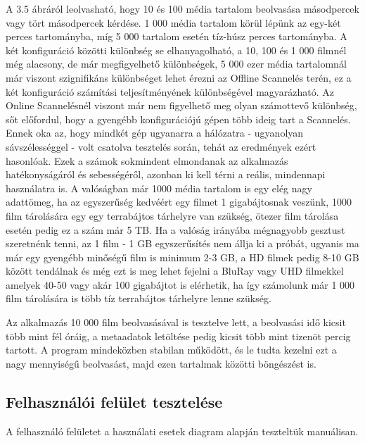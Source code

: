 A 3.5 ábráról leolvasható, hogy 10 és 100 média tartalom beolvasása másodpercek vagy tört másodpercek kérdése. 1 000 média tartalom körül lépünk az egy-két perces tartományba, míg 5 000 tartalom esetén tíz-húsz perces tartományba. A két konfiguráció közötti különbség se elhanyagolható, a 10, 100 és 1 000 filmnél még alacsony, de már megfigyelhető különbségek, 5 000 ezer média tartalomnál már viszont szignifikáns különbséget lehet érezni az Offline Scannelés terén, ez a két konfiguráció számítási teljesítményének különbségével magyarázható. Az Online Scannelésnél viszont már nem figyelhető meg olyan számottevő különbség, sőt előfordul, hogy a gyengébb konfigurációjú gépen több ideig tart a Scannelés. Ennek oka az, hogy mindkét gép ugyanarra a hálózatra - ugyanolyan sávszélességgel - volt csatolva tesztelés során, tehát az eredmények ezért hasonlóak.
Ezek a számok sokmindent elmondanak az alkalmazás hatékonyságáról és sebességéről, azonban ki kell térni a reális, mindennapi használatra is. A valóságban már 1000 média tartalom is egy elég nagy adattömeg, ha az egyszerűség kedvéért egy filmet 1 gigabájtosnak veszünk, 1000 film tárolására egy egy terrabájtos tárhelyre van szükség, ötezer film tárolása esetén pedig ez a szám már 5 TB. Ha a valóság irányába mégnagyobb gesztust szeretnénk tenni, az 1 film - 1 GB egyszerűsítés nem állja ki a próbát, ugyanis ma már egy gyengébb minőségű film is minimum 2-3 GB, a HD filmek pedig 8-10 GB között tendálnak és még ezt is meg lehet fejelni a BluRay vagy UHD filmekkel amelyek 40-50 vagy akár 100 gigabájtot is elérhetik, ha így számolunk már 1 000 film tárolására is több tíz terrabájtos tárhelyre lenne szükség.

Az alkalmazás 10 000 film beolvasásával is tesztelve lett, a beolvasási idő kicsit több mint fél óráig, a metaadatok letöltése pedig kicsit több mint tizenöt percig tartott. A program mindeközben stabilan működött, és le tudta kezelni ezt a nagy mennyiségű beolvasást, majd ezen tartalmak közötti böngészést is.

\cleardoublepage
\subsection{Felhasználói felület tesztelése}
A felhasználó felületet a használati esetek diagram alapján teszteltük manuálisan.

